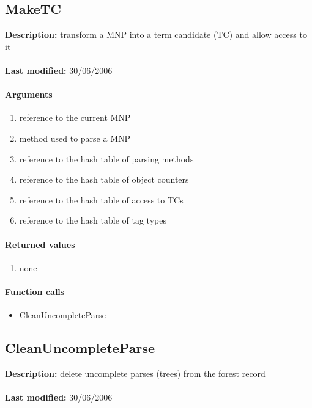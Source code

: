 \subsection{MakeTC}
\textbf{Description:} transform a MNP into a term candidate (TC) and allow access to it\\
\\\textbf{Last modified:} 30/06/2006

\paragraph{Arguments}
\begin{enumerate}
\item reference to the current MNP
\item method used to parse a MNP
\item reference to the hash table of parsing methods
\item reference to the hash table of object counters
\item reference to the hash table of access to TCs
\item reference to the hash table of tag types
\end{enumerate}

\paragraph{Returned values}
\begin{enumerate}
\item none
\end{enumerate}

\paragraph{Function calls}
\begin{itemize}
\item CleanUncompleteParse
\end{itemize}

\subsection{CleanUncompleteParse}
\textbf{Description:} delete uncomplete parses (trees) from the forest record\\
\\\textbf{Last modified:} 30/06/2006

